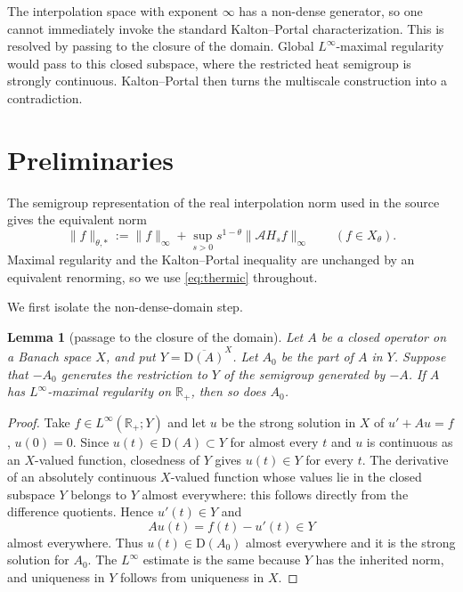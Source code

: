 \documentclass[11pt]{article}
\newtheorem{lemma}[theorem]{Lemma}
\newcommand{\R}{\mathbb R}
\newcommand{\cA}{\mathcal A}
\newcommand{\D}{\mathrm D}
\newcommand{\closure}[1]{\overline{#1}}
\begin{document}
The interpolation space with exponent $\infty$ has a non-dense generator,
so one cannot immediately invoke the standard Kalton--Portal
characterization.  This is resolved by passing to the closure of the domain.
Global $L^\infty$-maximal regularity would pass to this closed subspace, where
the restricted heat semigroup is strongly continuous.  Kalton--Portal then
turns the multiscale construction into a contradiction.

\section{Preliminaries}

The semigroup representation of the real interpolation norm used in the
source gives the equivalent norm
\begin{equation}\label{eq:thermic}
 \|f\|_{\theta,*}
 :=\|f\|_\infty+
   \sup_{s>0}s^{1-\theta}\|\cA H_s f\|_\infty
 \qquad (f\in X_\theta).
\end{equation}
Maximal regularity and the Kalton--Portal inequality are unchanged by an
equivalent renorming, so we use \eqref{eq:thermic} throughout.

We first isolate the non-dense-domain step.

\begin{lemma}[passage to the closure of the domain]\label{lem:closure}
Let $A$ be a closed operator on a Banach space $X$, and put
$Y=\closure{\D(A)}^X$.  Let $A_0$ be the part of $A$ in $Y$.  Suppose that
$-A_0$ generates the restriction to $Y$ of the semigroup generated by $-A$.
If $A$ has $L^\infty$-maximal regularity on $\R_+$, then so does $A_0$.
\end{lemma}

\begin{proof}
Take $f\in L^\infty(\R_+;Y)$ and let $u$ be the strong solution in $X$ of
$u'+Au=f$, $u(0)=0$.  Since $u(t)\in\D(A)\subset Y$ for almost every $t$
and $u$ is continuous as an $X$-valued function, closedness of $Y$ gives
$u(t)\in Y$ for every $t$.  The derivative of an absolutely continuous
$X$-valued function whose values lie in the closed subspace $Y$ belongs to
$Y$ almost everywhere: this follows directly from the difference quotients.
Hence $u'(t)\in Y$ and
\[
 Au(t)=f(t)-u'(t)\in Y
\]
almost everywhere.  Thus $u(t)\in\D(A_0)$ almost everywhere and it is the
strong solution for $A_0$.  The $L^\infty$ estimate is the same because $Y$
has the inherited norm, and uniqueness in $Y$ follows from uniqueness in
$X$.
\end{proof}
\end{document}
